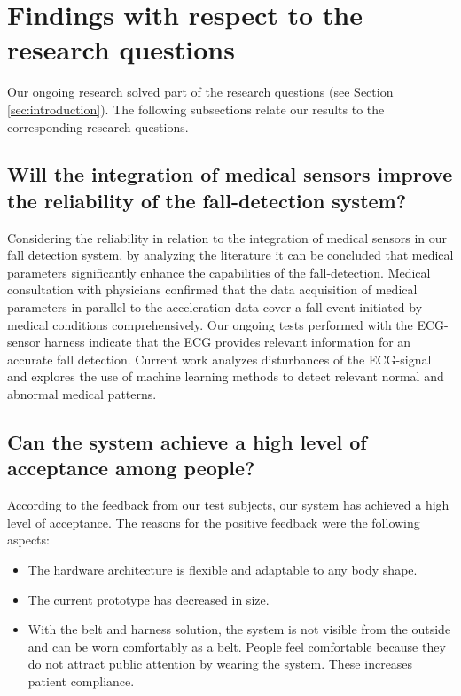 \documentclass[review]{elsarticle}
\begin{document}
	
\section{Findings with respect to the research questions}
\label{sec:FindingsResearchQuestions}
Our ongoing research solved part of the research questions (see Section \ref{sec:introduction}). The following subsections relate our results to the corresponding research questions.

\subsection{Will the integration of medical sensors improve the reliability of the fall-detection system?}
\label{subsec:integrationMedicalSensors}
Considering the reliability in relation to the integration of medical sensors in our fall detection system, by analyzing the literature \cite{Gjoreski2014} it can be concluded that medical parameters significantly enhance the capabilities of the fall-detection. Medical consultation with physicians \cite{DrNicoletteWagner} confirmed that the data acquisition of medical parameters in parallel to the acceleration data cover a fall-event initiated by medical conditions comprehensively. Our ongoing tests performed with the ECG-sensor harness indicate that the ECG provides relevant information for an accurate fall detection.  Current work analyzes disturbances of the ECG-signal and explores the use of machine learning methods to detect relevant normal and abnormal medical patterns. 

\subsection{Can the system achieve a high level of acceptance among people?}
\label{subsec:acceptanceSystem}
According to the feedback from our test subjects, our system has achieved a high level of acceptance. The reasons for the positive feedback were the following aspects:
\begin{itemize}
	\item The hardware architecture is flexible and adaptable to any body shape.
	\item The current prototype has decreased in size.
	\item With the belt and harness solution, the system is not visible from the outside and can be worn comfortably as a belt. People feel comfortable because they do not attract public attention by wearing the system. These increases patient compliance.
\end{itemize}
 
\end{document}
